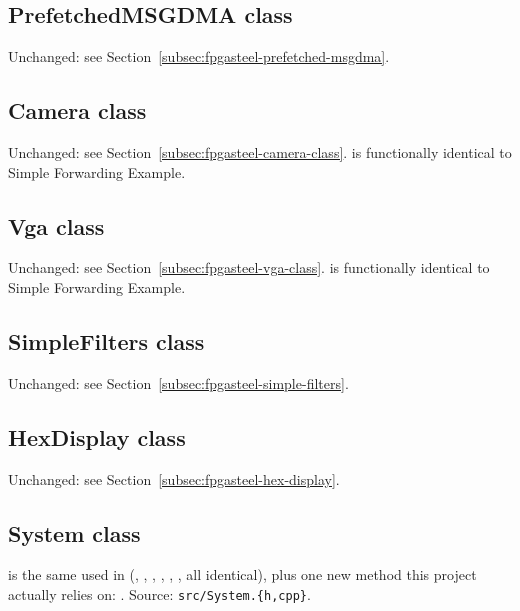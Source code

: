 \subsection{PrefetchedMSGDMA class}
\label{subsec:fpgasteel-cache-prefetched-msgdma}

Unchanged: see Section~\ref{subsec:fpgasteel-prefetched-msgdma}.

\subsection{Camera class}
\label{subsec:fpgasteel-cache-camera-class}

Unchanged: see Section~\ref{subsec:fpgasteel-camera-class}.  is functionally identical to Simple Forwarding Example.

\subsection{Vga class}
\label{subsec:fpgasteel-cache-vga-class}

Unchanged: see Section~\ref{subsec:fpgasteel-vga-class}.  is functionally identical to Simple Forwarding Example.

\subsection{SimpleFilters class}
\label{subsec:fpgasteel-cache-simple-filters}

Unchanged: see Section~\ref{subsec:fpgasteel-simple-filters}.

\subsection{HexDisplay class}
\label{subsec:fpgasteel-cache-hex-display}

Unchanged: see Section~\ref{subsec:fpgasteel-hex-display}.

\subsection{System class}
\label{subsec:fpgasteel-cache-system-class}

 is the same  used in  (, , , , , , all identical), plus one new method this project actually relies on: . Source: \lstinline[style=inlineFsRepo]!src/System.{h,cpp}!.

